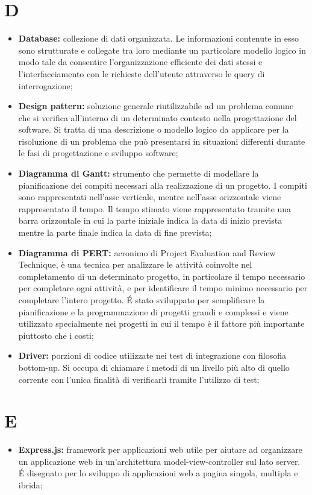 \section*{D} %
\label{sec:d}
	\begin{itemize}
		\item \textbf{Database:} collezione di dati organizzata. Le informazioni contenute in esso sono strutturate e collegate tra loro mediante un particolare modello logico in modo tale da consentire l'organizzazione efficiente dei dati stessi e l'interfacciamento con le richieste dell'utente attraverso le query di interrogazione;
		\item \textbf{Design pattern:} soluzione generale riutilizzabile ad un problema comune che si verifica all'interno di un determinato contesto nella progettazione del software. Si tratta di una descrizione o modello logico da applicare per la risoluzione di un problema che può presentarsi in situazioni differenti durante le fasi di progettazione e sviluppo software;
		\item \textbf{Diagramma di Gantt:} strumento che permette di modellare la pianificazione dei compiti necessari alla realizzazione di un progetto. I compiti sono rappresentati nell'asse verticale, mentre nell'asse orizzontale viene rappresentato il tempo. Il tempo stimato viene rappresentato tramite una barra orizzontale in cui la parte iniziale indica la data di inizio prevista mentre la parte finale indica la data di fine prevista;
		\item \textbf{Diagramma di PERT:} acronimo di Project Evaluation and Review Technique, è una tecnica per analizzare le attività coinvolte nel completamento di un determinato progetto, in particolare il tempo necessario per completare ogni attività, e per identificare il tempo minimo necessario per completare l'intero progetto. É stato sviluppato per semplificare la pianificazione e la programmazione di progetti grandi e complessi e viene utilizzato specialmente nei progetti in cui il tempo è il fattore più importante piuttosto che i costi;
		\item \textbf{Driver:} porzioni di codice utilizzate nei test di integrazione con filosofia bottom-up. Si occupa di chiamare i metodi di un livello più alto di quello corrente con l'unica finalità di verificarli tramite l'utilizzo di test;
	\end{itemize}
\pagebreak

\section*{E} %
\label{sec:e}
	\begin{itemize}
		\item \textbf{Express.js:} framework per applicazioni web utile per aiutare ad organizzare un applicazione web in un'architettura model-view-controller sul lato server. É disegnato per lo sviluppo di applicazioni web a pagina singola, multipla e ibrida;
	\end{itemize}
\pagebreak
